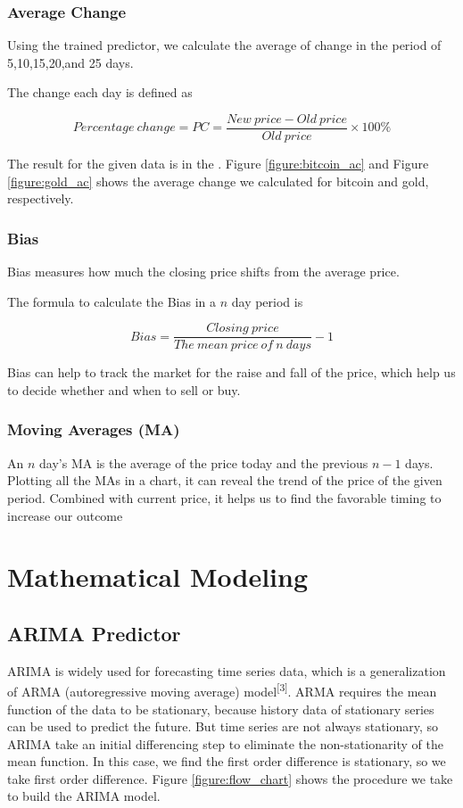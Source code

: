 \documentclass[12pt,a4paper]{article}
\newcommand{\Predictor}{ARIMA }
\begin{document}
\begin{spacing}{1.2}
\subsubsection{Average Change}

Using the trained predictor, we calculate the average of change in the period of 5,10,15,20,and 25 days.

The change each day is defined as

$$
Percentage \ change = PC = \frac{New \ price-Old \ price}{Old \ price} \times 100\%
$$


The result for the given data is in the . Figure \ref{figure:bitcoin_ac} and Figure \ref{figure:gold_ac} shows the average change we calculated for bitcoin and gold, respectively.


\subsubsection{Bias}

Bias measures how much the closing price shifts from the average price.

The formula to calculate the Bias in a $n$ day period is

$$
Bias = \frac{Closing \ price}{The \ mean \ price \ of \ n \ days} - 1
$$

Bias can help to track the market for the raise and fall of the price, which help us to decide whether and when to sell or buy.

\subsubsection{Moving Averages (MA)}

An $n$ day's MA is the average of the price today and the previous $n-1$ days. Plotting all the MAs in a chart, it can reveal the trend of the price of the given period. Combined with current price, it helps us to find the favorable timing to increase our outcome

\section{Mathematical Modeling}
\label{MathModels}

\subsection{\Predictor Predictor}

\Predictor is widely used for forecasting time series data, which is a generalization of ARMA (autoregressive moving average) model\textsuperscript{[3]}. ARMA requires the mean function of the data to be stationary, because history data of stationary series can be used to predict the future. But time series are not always stationary, so ARIMA take an initial differencing step to eliminate the non-stationarity of the mean function. In this case, we find the first order difference is stationary, so we take first order difference. Figure \ref{figure:flow_chart} shows the procedure we take to build the \Predictor model.


\end{spacing}
\end{document}
